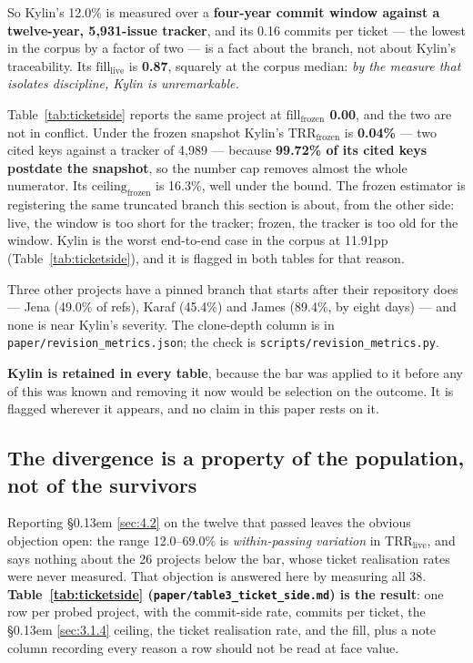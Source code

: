 \documentclass[conference]{IEEEtran}
\begin{document}
So Kylin's 12.0\% is measured over a \textbf{four-year commit window against a twelve-year, 5,931-issue tracker}, and its 0.16 commits per ticket --- the lowest in the corpus by a factor of two --- is a fact about the branch, not about Kylin's traceability. Its $\mathrm{fill}_\mathrm{live}$ is \textbf{0.87}, squarely at the corpus median: \emph{by the measure that isolates discipline, Kylin is unremarkable.}

Table~\ref{tab:ticketside} reports the same project at \textbf{$\mathrm{fill}_\mathrm{frozen}$ 0.00}, and the two are not in conflict. Under the frozen snapshot Kylin's $\mathrm{TRR}_\mathrm{frozen}$ is \textbf{0.04\%} --- two cited keys against a tracker of 4,989 --- because \textbf{99.72\% of its cited keys postdate the snapshot}, so the number cap removes almost the whole numerator. Its $\mathrm{ceiling}_\mathrm{frozen}$ is 16.3\%, well under the bound. The frozen estimator is registering the same truncated branch this section is about, from the other side: live, the window is too short for the tracker; frozen, the tracker is too old for the window. Kylin is the worst end-to-end case in the corpus at 11.91pp (Table~\ref{tab:ticketside}), and it is flagged in both tables for that reason.

Three other projects have a pinned branch that starts after their repository does --- Jena (49.0\% of refs), Karaf (45.4\%) and James (89.4\%, by eight days) --- and none is near Kylin's severity. The clone-depth column is in \texttt{paper/\allowbreak{}revision\_\allowbreak{}metrics.\allowbreak{}json}; the check is \texttt{scripts/\allowbreak{}revision\_\allowbreak{}metrics.\allowbreak{}py}.

\textbf{Kylin is retained in every table}, because the bar was applied to it before any of this was known and removing it now would be selection on the outcome. It is flagged wherever it appears, and no claim in this paper rests on it.

\subsection{The divergence is a property of the population, not of the survivors}
\label{sec:4.3}

Reporting \S\kern0.13em \ref{sec:4.2} on the twelve that passed leaves the obvious objection open: the range 12.0--69.0\% is \emph{within-passing variation} in $\mathrm{TRR}_\mathrm{live}$, and says nothing about the 26 projects below the bar, whose ticket realisation rates were never measured. That objection is answered here by measuring all 38. \textbf{Table~\ref{tab:ticketside} (\texttt{paper/\allowbreak{}table3\_\allowbreak{}ticket\_\allowbreak{}side.\allowbreak{}md}) is the result}: one row per probed project, with the commit-side rate, commits per ticket, the \S\kern0.13em \ref{sec:3.1.4} ceiling, the ticket realisation rate, and the fill, plus a note column recording every reason a row should not be read at face value.
\end{document}
